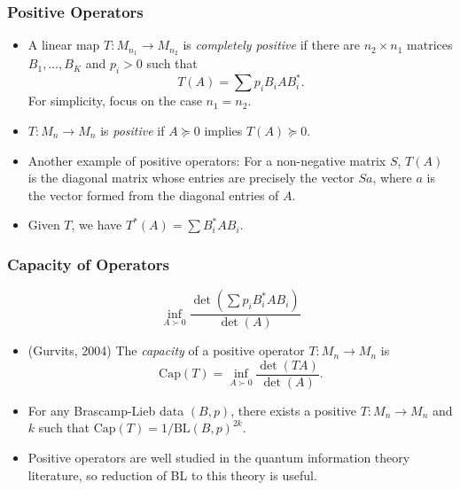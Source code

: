 \documentclass[handout,usenames,dvipsnames,12pt]{beamer}
\begin{document}
\begin{frame}
    \frametitle{Positive Operators}

    \begin{itemize}
        \item A linear map $T: M_{n_1} \to M_{n_2}$ is \emph{completely positive} if there are $n_2 \times n_1$ matrices $B_1,\dots,B_K$ and $p_i > 0$ such that
        \[ T(A) = \sum p_i B_i A B_i^*. \]
        For simplicity, focus on the case $n_1 = n_2$.

        \pause
        \item $T: M_n \to M_n$ is \emph{positive} if $A \succeq 0$ implies $T(A) \succeq 0$.

        \pause
        \item Another example of positive operators: For a non-negative matrix $S$, $T(A)$ is the diagonal matrix whose entries are precisely the vector $Sa$, where $a$ is the vector formed from the diagonal entries of $A$.

        \pause
        \item Given $T$, we have $T^*(A) = \sum B_i^* A B_i$.
    \end{itemize}
\end{frame}

\begin{frame}
    \frametitle{Capacity of Operators}

    \[ \inf_{A \succ 0} \frac{\det(\sum p_i B_i^* A B_i)}{\det(A)}  \]

    \begin{itemize}
        \pause
        \item (Gurvits, 2004) The \emph{capacity} of a positive operator $T: M_n \to M_n$ is
        \[ \text{Cap}(T) = \inf_{A \succ 0} \frac{\det(TA)}{\det(A)}. \]

        \pause
        \item For any Brascamp-Lieb data $(B,p)$, there exists a positive $T: M_n \to M_n$ and $k$ such that $\text{Cap}(T) = 1/\text{BL}(B,p)^{2k}$.

        \pause
        \item Positive operators are well studied in the quantum information theory literature, so reduction of BL to  this theory is useful.
    \end{itemize}
\end{frame}
\end{document}

